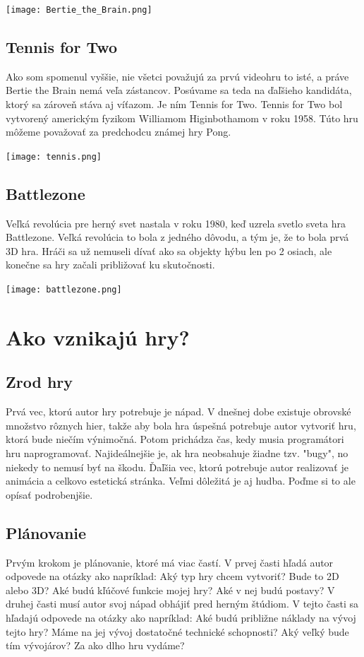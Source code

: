 \documentclass[10pt,twoside,slovak,a4paper]{article}
\begin{document}
\texttt{[image: Bertie\_the\_Brain.png]}
~\cite{4}

\subsection{Tennis for Two} \label{historia:tennis}
Ako som spomenul vyššie, nie všetci považujú za prvú videohru to isté, a práve Bertie the Brain nemá veľa zástancov. Posúvame sa teda na ďaľšieho kandidáta, ktorý sa zároveň stáva aj víťazom. Je ním Tennis for Two. Tennis for Two bol vytvorený americkým fyzikom Williamom Higinbothamom v roku 1958. Túto hru môžeme považovať za predchodcu známej hry Pong.

\texttt{[image: tennis.png]}
~\cite{5}

\subsection{Battlezone} \label{historia:battlezone}
Veľká revolúcia pre herný svet nastala v roku 1980, keď uzrela svetlo sveta hra Battlezone. Veľká revolúcia to bola z jedného dôvodu, a tým je, že to bola prvá 3D hra. Hráči sa už nemuseli dívať ako sa objekty hýbu len po 2 osiach, ale konečne sa hry začali približovať ku skutočnosti.~\cite{3}

\texttt{[image: battlezone.png]}
~\cite{6}

\section{Ako vznikajú hry?} \label{pocitacove}

\subsection{Zrod hry}

Prvá vec, ktorú autor hry potrebuje je nápad. V dnešnej dobe existuje obrovské množstvo rôznych hier, takže aby bola hra úspešná potrebuje autor vytvoriť hru, ktorá bude niečím výnimočná. Potom prichádza čas, kedy musia programátori hru naprogramovať. Najideálnejšie je, ak hra neobsahuje žiadne tzv. "bugy", no niekedy to nemusí byť na škodu. Ďaľšia vec, ktorú potrebuje autor realizovať je animácia a celkovo estetická stránka. Veľmi dôležitá je aj hudba. Poďme si to ale opísať podrobenjšie.

\subsection{Plánovanie}
Prvým krokom je plánovanie, ktoré má viac častí. V prvej časti hľadá autor odpovede na otázky ako napríklad: Aký typ hry chcem vytvoriť? Bude to 2D alebo 3D? Aké budú kľúčové funkcie mojej hry? Aké v nej budú postavy? V druhej časti musí autor svoj nápad obhájiť pred herným štúdiom. V tejto časti sa hľadajú odpovede na otázky ako napríklad: Aké budú približne náklady na vývoj tejto hry? Máme na jej vývoj dostatočné technické schopnosti? Aký veľký bude tím vývojárov? Za ako dlho hru vydáme?
\end{document}
